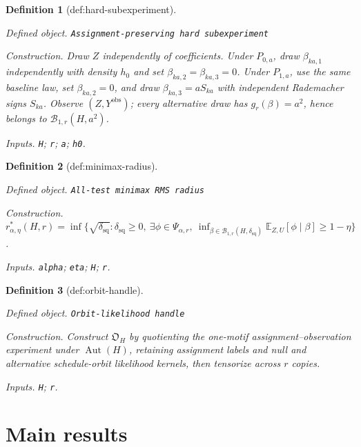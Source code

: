 \documentclass{article}
\newtheorem{definition}{Definition}
\begin{document}
\begin{definition}[def:hard-subexperiment]\label{def:hard-subexperiment}
\par\smallskip\noindent\emph{Defined object.} \texttt{Assignment-\allowbreak{}preserving hard subexperiment}
\par\smallskip\noindent\emph{Construction.} Draw \(Z\) independently of coefficients. Under \(P_{0,a}\), draw \(\beta_{ka,1}\) independently with density \(h_0\) and set \(\beta_{ka,2}=\beta_{ka,3}=0\). Under \(P_{1,a}\), use the same baseline law, set \(\beta_{ka,2}=0\), and draw \(\beta_{ka,3}=aS_{ka}\) with independent Rademacher signs \(S_{ka}\). Observe \((Z,Y^{\mathrm{obs}})\); every alternative draw has \(g_r(\beta)=a^2\), hence belongs to \(\mathcal B_{1,r}(H,a^2)\).
\par\smallskip\noindent\emph{Inputs.} \texttt{H}; \texttt{r}; \texttt{a}; \texttt{h0}.
\end{definition}

\begin{definition}[def:minimax-radius]\label{def:minimax-radius}
\par\smallskip\noindent\emph{Defined object.} \texttt{All-\allowbreak{}test minimax RMS radius}
\par\smallskip\noindent\emph{Construction.} \(r^*_{\alpha,\eta}(H,r)=\inf\{\sqrt{\delta_{\mathrm{sq}}}:\delta_{\mathrm{sq}}\ge0,\ \exists\phi\in\Psi_{\alpha,r},\ \inf_{\beta\in\mathcal B_{1,r}(H,\delta_{\mathrm{sq}})}\mathbb E_{Z,U}[\phi\mid\beta]\ge1-\eta\}\).
\par\smallskip\noindent\emph{Inputs.} \texttt{alpha}; \texttt{eta}; \texttt{H}; \texttt{r}.
\end{definition}

\begin{definition}[def:orbit-handle]\label{def:orbit-handle}
\par\smallskip\noindent\emph{Defined object.} \texttt{Orbit-\allowbreak{}likelihood handle}
\par\smallskip\noindent\emph{Construction.} Construct \(\mathfrak O_H\) by quotienting the one-motif assignment--observation experiment under \(\operatorname{Aut}(H)\), retaining assignment labels and null and alternative schedule-orbit likelihood kernels, then tensorize across \(r\) copies.
\par\smallskip\noindent\emph{Inputs.} \texttt{H}; \texttt{r}.
\end{definition}

\section{Main results}
\end{document}
